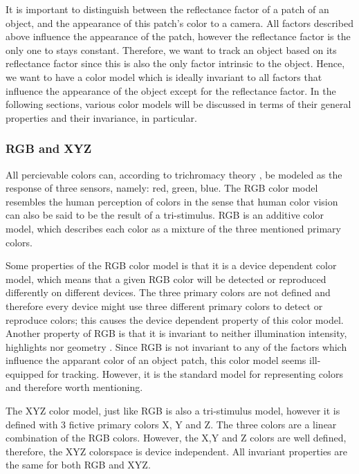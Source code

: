 \documentclass[a4paper,11pt]{article}
\begin{document}
It is important to distinguish between the reflectance factor of a patch of an object, and the appearance of this patch's color to a camera. All factors described above influence the appearance of the patch, however the reflectance factor is the only one to stays constant. Therefore, we want to track an object based on its reflectance factor since this is also the only factor intrinsic to the object.  Hence, we want to have a color model which is ideally invariant to all factors that influence the appearance of the object except for the reflectance factor. In the following sections, various color models will be discussed in terms of their general properties and their invariance, in particular. 



\subsubsection{RGB and XYZ}

		

All percievable colors can, according to trichromacy theory \cite{gevers_color}, be modeled as the response of three sensors, namely: red, green, blue. The RGB color model resembles the human perception of colors in the sense that human color vision can also be said to be the result of a tri-stimulus.  RGB is an additive color model, which describes each color as a mixture of the three mentioned primary colors.



Some properties of the RGB color model is that it is a device dependent color model, which means that a given RGB color will be detected or reproduced differently on different devices. The three primary colors are not defined and therefore every device might use three different primary colors to detect or reproduce colors; this causes the device dependent property of this color model. Another property of RGB is that it is invariant to neither illumination intensity, highlights nor geometry \cite{gevers_invariant}. Since RGB is not invariant to any of the factors which influence the apparant color of an object patch, this color model seems ill-equipped for tracking. However, it is the standard model for representing colors and therefore worth mentioning.



The XYZ color model, just like RGB is also a tri-stimulus model, however it is defined  with 3 fictive primary colors X, Y and Z. The three colors are a linear combination of the RGB colors. However, the X,Y and Z colors are well defined, therefore, the XYZ colorspace is device independent. All invariant properties are the same for both RGB and XYZ.
\end{document}
